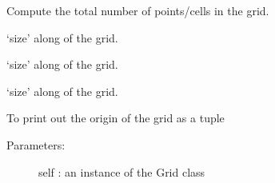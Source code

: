 \documentclass[letterpaper,10pt,english]{sphinxmanual}
\begin{document}
\begin{fulllineitems}
\begin{fulllineitems}
\end{fulllineitems}


\begin{fulllineitems}
\label{\detokenize{appendices:s2Dcd.grid.Grid.get_size}}
Compute the total number of points/cells in the grid.

\end{fulllineitems}


\begin{fulllineitems}
\label{\detokenize{appendices:s2Dcd.grid.Grid.lx}}
‘size’ along  of the grid.

\end{fulllineitems}


\begin{fulllineitems}
\label{\detokenize{appendices:s2Dcd.grid.Grid.ly}}
‘size’ along  of the grid.

\end{fulllineitems}


\begin{fulllineitems}
\label{\detokenize{appendices:s2Dcd.grid.Grid.lz}}
‘size’ along  of the grid.

\end{fulllineitems}


\begin{fulllineitems}
\label{\detokenize{appendices:s2Dcd.grid.Grid.origin}}
To print out the origin of the grid as a tuple
\begin{description}
\item[{Parameters:}] \leavevmode
self : an instance of the Grid class


\end{description}
\end{fulllineitems}
\end{fulllineitems}
\end{document}
